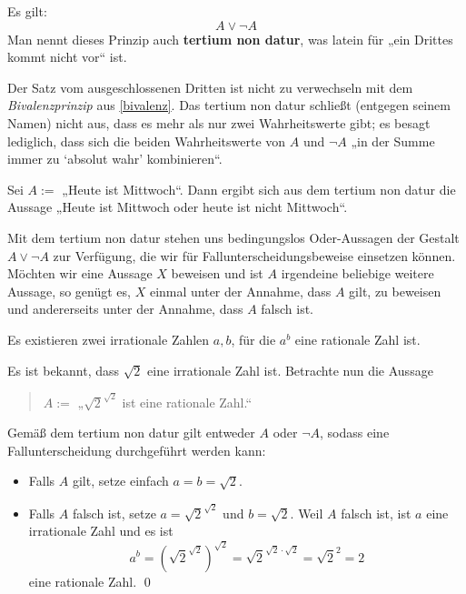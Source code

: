 \begin{axi} \label{tnd}
Es gilt:
 \[ A\lor \neg A \]
Man nennt dieses Prinzip auch \textbf{tertium non datur}, was latein für „ein Drittes kommt nicht vor“ ist.
\end{axi}



\begin{bem}
 Der Satz vom ausgeschlossenen Dritten ist nicht zu verwechseln mit dem \emph{Bivalenzprinzip} aus \cref{bivalenz}. Das tertium non datur schließt (entgegen seinem Namen) nicht aus, dass es mehr als nur zwei Wahrheitswerte gibt; es besagt lediglich, dass sich die beiden Wahrheitswerte von $A$ und $\neg A$ „in der Summe immer zu `absolut wahr' kombinieren“.
\end{bem}



\begin{bsp}
 Sei $A:=$ „Heute ist Mittwoch“. Dann ergibt sich aus dem tertium non datur die Aussage „Heute ist Mittwoch oder heute ist nicht Mittwoch“.
\end{bsp}


\begin{bem}
 Mit dem tertium non datur stehen uns bedingungslos Oder-Aussagen der Gestalt $A\lor \neg A$ zur Verfügung, die wir für Fallunterscheidungsbeweise einsetzen können. Möchten wir eine Aussage $X$ beweisen und ist $A$ irgendeine beliebige weitere Aussage, so genügt es, $X$ einmal unter der Annahme, dass $A$ gilt, zu beweisen und andererseits unter der Annahme, dass $A$ falsch ist.
\end{bem}


\begin{bsp}
  Es existieren zwei irrationale Zahlen $a,b$, für die $a^b$ eine rationale Zahl ist.
   \end{bsp}
   \begin{bew}
   Es ist bekannt, dass $\sqrt{2}$ eine irrationale Zahl ist. Betrachte nun die Aussage
   \begin{quote}
    $A:=$ „$\sqrt{2}^{\sqrt{2}}$ ist eine rationale Zahl.“
   \end{quote}
Gemäß dem tertium non datur gilt entweder $A$ oder $\neg A$, sodass eine Fallunterscheidung durchgeführt werden kann:
\begin{itemize}
 \item Falls $A$ gilt, setze einfach $a=b=\sqrt{2}$.
 \item Falls $A$ falsch ist, setze $a=\sqrt{2}^{\sqrt{2}}$ und $b=\sqrt{2}$. Weil $A$ falsch ist, ist $a$ eine irrationale Zahl und es ist
 \[ a^b = (\sqrt{2}^{\sqrt{2}})^{\sqrt{2}} = \sqrt{2}^{\sqrt{2}\cdot\sqrt{2}} = \sqrt{2}^2 = 2 \]
 eine rationale Zahl. \qed
\end{itemize}
   \end{bew}


